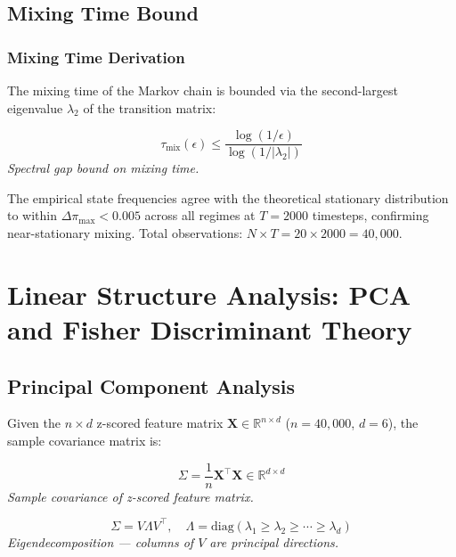 \documentclass[12pt]{article}
\begin{document}
\subsection{Mixing Time Bound}


\subsubsection{Mixing Time Derivation}

The mixing time of the Markov chain is bounded via the
second-largest eigenvalue $\lambda_2$ of the transition matrix:

\begin{equation}
\tau_{\mathrm{mix}}(\epsilon) \leq \frac{\log(1/\epsilon)}{\log(1/|\lambda_2|)}
\end{equation}
\noindent\textit{Spectral gap bound on mixing time.}


\noindent The empirical state frequencies agree with the theoretical stationary distribution to within $\Delta\pi_{\max} < 0.005$ across all regimes at $T = 2000$ timesteps, confirming near-stationary mixing. Total observations: $N \times T = 20 \times 2000 = 40,000$.



\section{Linear Structure Analysis: PCA and Fisher Discriminant Theory}


\subsection{Principal Component Analysis}

Given the $n \times d$ z-scored feature matrix
$\mathbf{X} \in \mathbb{R}^{n \times d}$
($n=40,000$, $d=6$),
the sample covariance matrix is:

\begin{equation}
\Sigma = \frac{1}{n}\mathbf{X}^\top\mathbf{X} \in \mathbb{R}^{d \times d}
\end{equation}
\noindent\textit{Sample covariance of z-scored feature matrix.}


\begin{equation}
\Sigma = V \Lambda V^\top, \quad \Lambda = \mathrm{diag}(\lambda_1 \geq \lambda_2 \geq \cdots \geq \lambda_d)
\end{equation}
\noindent\textit{Eigendecomposition — columns of $V$ are principal directions.}
\end{document}
